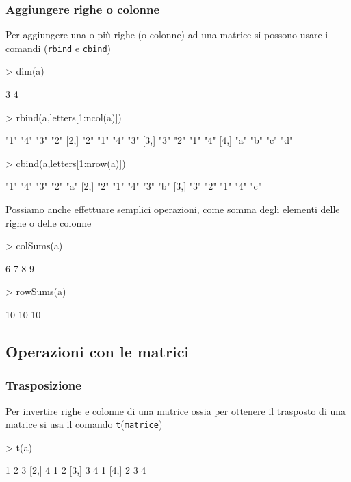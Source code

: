 \documentclass[onecolumn,12pt]{book}
\begin{document}
\subsubsection{Aggiungere righe o colonne}
Per aggiungere una o pi\`u righe (o colonne)
ad una matrice si possono usare i comandi (\texttt{rbind} e \texttt{cbind})
\begin{Schunk}
\begin{Sinput}
> dim(a)
\end{Sinput}
\begin{Soutput}
[1] 3 4
\end{Soutput}
\begin{Sinput}
> rbind(a,letters[1:ncol(a)])
\end{Sinput}
\begin{Soutput}
     [,1] [,2] [,3] [,4]
[1,] "1"  "4"  "3"  "2" 
[2,] "2"  "1"  "4"  "3" 
[3,] "3"  "2"  "1"  "4" 
[4,] "a"  "b"  "c"  "d" 
\end{Soutput}
\begin{Sinput}
> cbind(a,letters[1:nrow(a)])
\end{Sinput}
\begin{Soutput}
     [,1] [,2] [,3] [,4] [,5]
[1,] "1"  "4"  "3"  "2"  "a" 
[2,] "2"  "1"  "4"  "3"  "b" 
[3,] "3"  "2"  "1"  "4"  "c" 
\end{Soutput}
\end{Schunk}
Possiamo anche effettuare semplici operazioni, come somma degli elementi delle righe o delle colonne
\begin{Schunk}
\begin{Sinput}
> colSums(a)
\end{Sinput}
\begin{Soutput}
[1] 6 7 8 9
\end{Soutput}
\begin{Sinput}
> rowSums(a)
\end{Sinput}
\begin{Soutput}
[1] 10 10 10
\end{Soutput}
\end{Schunk}

\subsection{Operazioni con le matrici}
\subsubsection{Trasposizione}
Per invertire righe e colonne di una matrice ossia per ottenere il trasposto  di una matrice si usa il comando \texttt{t}(\texttt{matrice})
\begin{Schunk}
\begin{Sinput}
> t(a)
\end{Sinput}
\begin{Soutput}
     [,1] [,2] [,3]
[1,]    1    2    3
[2,]    4    1    2
[3,]    3    4    1
[4,]    2    3    4
\end{Soutput}
\end{Schunk}
\end{document}
